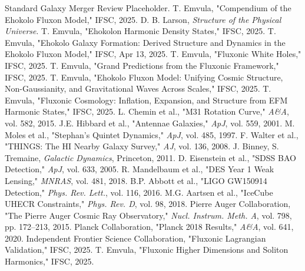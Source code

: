 \documentclass[11pt]{article}
\begin{document}
\begin{thebibliography}{22}
\raggedright
{} Standard Galaxy Merger Review Placeholder.
 T. Emvula, "Compendium of the Ehokolo Fluxon Model," IFSC, 2025.
 D. B. Larson, \textit{Structure of the Physical Universe}.
 T. Emvula, "Ehokolon Harmonic Density States," IFSC, 2025.
 T. Emvula, "Ehokolo Galaxy Formation: Derived Structure and Dynamics in the Ehokolo Fluxon Model," IFSC, Apr 13, 2025.
 T. Emvula, "Fluxonic White Holes," IFSC, 2025.
 T. Emvula, "Grand Predictions from the Fluxonic Framework," IFSC, 2025.
 T. Emvula, "Ehokolo Fluxon Model: Unifying Cosmic Structure, Non-Gaussianity, and Gravitational Waves Across Scales," IFSC, 2025.
 T. Emvula, "Fluxonic Cosmology: Inflation, Expansion, and Structure from EFM Harmonic States," IFSC, 2025.
 L. Chemin et al., "M31 Rotation Curve," \textit{A\&A}, vol. 582, 2015.
 J.E. Hibbard et al., "Antennae Galaxies," \textit{ApJ}, vol. 559, 2001.
 M. Moles et al., "Stephan’s Quintet Dynamics," \textit{ApJ}, vol. 485, 1997.
 F. Walter et al., "THINGS: The HI Nearby Galaxy Survey," \textit{AJ}, vol. 136, 2008.
 J. Binney, S. Tremaine, \textit{Galactic Dynamics}, Princeton, 2011.
 D. Eisenstein et al., "SDSS BAO Detection," \textit{ApJ}, vol. 633, 2005.
 R. Mandelbaum et al., "DES Year 1 Weak Lensing," \textit{MNRAS}, vol. 481, 2018.
 B.P. Abbott et al., "LIGO GW150914 Detection," \textit{Phys. Rev. Lett.}, vol. 116, 2016.
 M.G. Aartsen et al., "IceCube UHECR Constraints," \textit{Phys. Rev. D}, vol. 98, 2018.
 Pierre Auger Collaboration, "The Pierre Auger Cosmic Ray Observatory," \textit{Nucl. Instrum. Meth. A}, vol. 798, pp. 172--213, 2015.
 Planck Collaboration, "Planck 2018 Results," \textit{A\&A}, vol. 641, 2020.
 Independent Frontier Science Collaboration, "Fluxonic Lagrangian Validation," IFSC, 2025.
 T. Emvula, "Fluxonic Higher Dimensions and Soliton Harmonics," IFSC, 2025.
\end{thebibliography}
\end{document}
